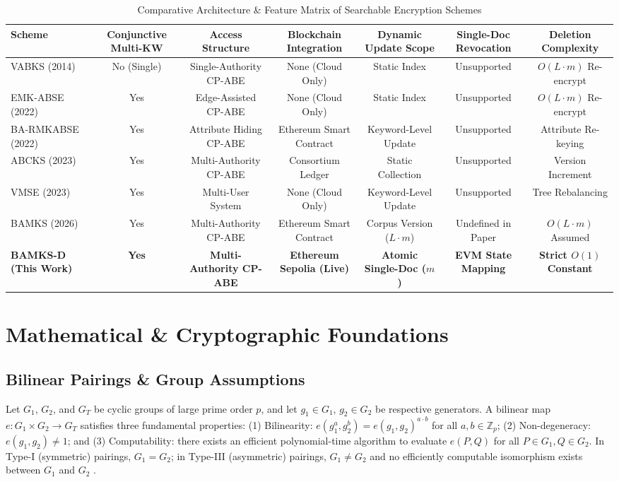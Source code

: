 \documentclass[journal,10pt,twocolumn]{IEEEtran}
\begin{document}
\begin{table}[t]
\caption{Comparative Architecture \& Feature Matrix of Searchable Encryption Schemes}
\label{tab:comparison}
\centering
\begin{tabular}{lcccccc}
\toprule
\textbf{Scheme} & \textbf{Conjunctive Multi-KW} & \textbf{Access Structure} & \textbf{Blockchain Integration} & \textbf{Dynamic Update Scope} & \textbf{Single-Doc Revocation} & \textbf{Deletion Complexity} \\
\midrule
VABKS (2014) \cite{zheng2014vabks} & No (Single) & Single-Authority CP-ABE & None (Cloud Only) & Static Index & Unsupported & $O(L \cdot m)$ Re-encrypt \\
EMK-ABSE (2022) \cite{liu2022emk} & Yes & Edge-Assisted CP-ABE & None (Cloud Only) & Static Index & Unsupported & $O(L \cdot m)$ Re-encrypt \\
BA-RMKABSE (2022) \cite{su2022barmk} & Yes & Attribute Hiding CP-ABE & Ethereum Smart Contract & Keyword-Level Update & Unsupported & Attribute Re-keying \\
ABCKS (2023) \cite{zhang2023abcks} & Yes & Multi-Authority CP-ABE & Consortium Ledger & Static Collection & Unsupported & Version Increment \\
VMSE (2023) \cite{liang2023vmse} & Yes & Multi-User System & None (Cloud Only) & Keyword-Level Update & Unsupported & Tree Rebalancing \\
BAMKS (2026) \cite{cheng2026bamks} & Yes & Multi-Authority CP-ABE & Ethereum Smart Contract & Corpus Version ($L \cdot m$) & Undefined in Paper & $O(L \cdot m)$ Assumed \\
\textbf{BAMKS-D (This Work)} & \textbf{Yes} & \textbf{Multi-Authority CP-ABE} & \textbf{Ethereum Sepolia (Live)} & \textbf{Atomic Single-Doc ($m$)} & \textbf{EVM State Mapping} & \textbf{Strict $O(1)$ Constant} \\
\bottomrule
\end{tabular}
\end{table}

\section{Mathematical \& Cryptographic Foundations}

\subsection{Bilinear Pairings \& Group Assumptions}
Let $G_1$, $G_2$, and $G_T$ be cyclic groups of large prime order $p$, and let $g_1 \in G_1$, $g_2 \in G_2$ be respective generators. A bilinear map $e: G_1 \times G_2 \to G_T$ satisfies three fundamental properties: (1) Bilinearity: $e(g_1^a, g_2^b) = e(g_1, g_2)^{a \cdot b}$ for all $a, b \in \mathbb{Z}_p$; (2) Non-degeneracy: $e(g_1, g_2) \neq 1$; and (3) Computability: there exists an efficient polynomial-time algorithm to evaluate $e(P, Q)$ for all $P \in G_1, Q \in G_2$. In Type-I (symmetric) pairings, $G_1 = G_2$; in Type-III (asymmetric) pairings, $G_1 \neq G_2$ and no efficiently computable isomorphism exists between $G_1$ and $G_2$ \cite{waters2011expressive}.
\end{document}
